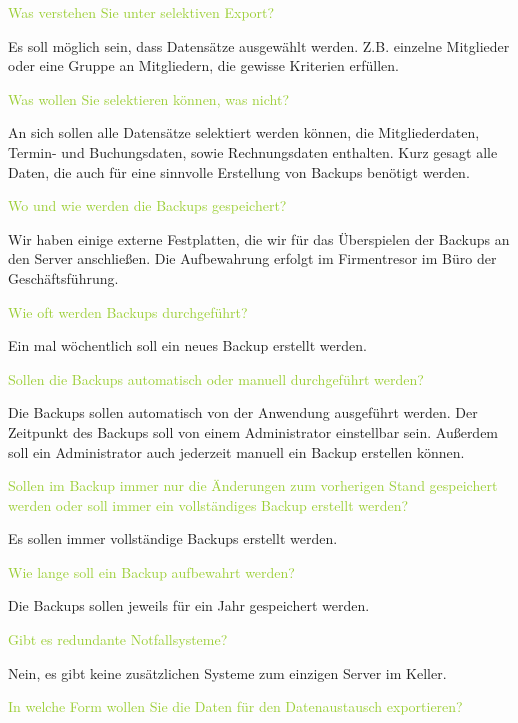 \textcolor{YellowGreen}{Was verstehen Sie unter selektiven Export?}

\textcolor{NavyBlue}{Es soll möglich sein, dass Datensätze ausgewählt werden. Z.B. einzelne Mitglieder oder eine Gruppe an Mitgliedern, die gewisse Kriterien erfüllen.}

\textcolor{YellowGreen}{Was wollen Sie selektieren können, was nicht?}

\textcolor{NavyBlue}{An sich sollen alle Datensätze selektiert werden können, die Mitgliederdaten, Termin- und Buchungsdaten, sowie Rechnungsdaten enthalten. Kurz gesagt alle Daten, die auch für eine sinnvolle Erstellung von Backups benötigt werden. }

\textcolor{YellowGreen}{Wo und wie werden die Backups gespeichert?}

\textcolor{NavyBlue}{Wir haben einige externe Festplatten, die wir für das Überspielen der Backups an den Server anschließen. Die Aufbewahrung erfolgt im Firmentresor im Büro der Geschäftsführung. }

\textcolor{YellowGreen}{Wie oft werden Backups durchgeführt?}

\textcolor{NavyBlue}{Ein mal wöchentlich soll ein neues Backup erstellt werden.}

\textcolor{YellowGreen}{Sollen die Backups automatisch oder manuell durchgeführt werden?}

\textcolor{NavyBlue}{Die Backups sollen automatisch von der Anwendung ausgeführt werden. Der Zeitpunkt des Backups soll von einem Administrator einstellbar sein. Außerdem soll ein Administrator auch jederzeit manuell ein Backup erstellen können.}

\textcolor{YellowGreen}{Sollen im Backup immer nur die Änderungen zum vorherigen Stand gespeichert werden oder soll immer ein vollständiges Backup erstellt werden?}

\textcolor{NavyBlue}{Es sollen immer vollständige Backups erstellt werden.}

\textcolor{YellowGreen}{Wie lange soll ein Backup aufbewahrt werden?}

\textcolor{NavyBlue}{Die Backups sollen jeweils für ein Jahr gespeichert werden.}

\textcolor{YellowGreen}{Gibt es redundante Notfallsysteme?}

\textcolor{NavyBlue}{Nein, es gibt keine zusätzlichen Systeme zum einzigen Server im Keller.}

\textcolor{YellowGreen}{In welche Form wollen Sie die Daten für den Datenaustausch exportieren?}

